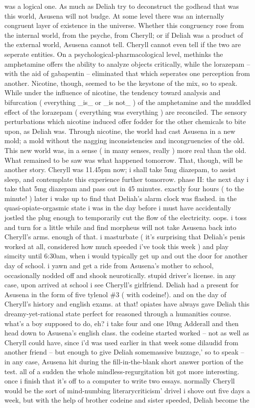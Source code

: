 \documentclass[12pt]{book}
\begin{document}
was a logical one. As much as Deliah try to deconstruct the godhead that was this world, Asusena will not budge. At some level there was an internally congruent layer of existence in the universe. Whether this congruency rose from the internal world, from the psyche, from Cheryll; or if Deliah was a product of the external world, Asusena cannot tell. Cheryll cannot even tell if the two are seperate entities. On a psychological-pharmacological level, methinks the amphetamine offers the ability to analyze objects critically, while the lorazepam -- with the aid of gabapentin -- eliminated that which seperates one perception from another. Nicotine, though, seemed to be the keystone of the mix, so to speak. While under the influence of nicotine, the tendency toward analysis and bifurcation ( everything \_is\_ or \_is not\_ ) of the amphetamine and the muddled effect of the lorazepam ( everything was everything ) are reconciled. The sensory perturbations which nicotine induced offer fodder for the other chemicals to bite upon, as Deliah was. Through nicotine, the world had cast Asusena in a new mold; a mold without the nagging inconsistencies and incongruencies of the old. This new world was, in a sense ( in many senses, really ) more real than the old. What remained to be saw was what happened tomorrow. That, though, will be another story. Cheryll was 11.45pm now; i shall take 5mg diazepam, to assist sleep, and contemplate this experience further tomorrow.  phase II: the next day i take that 5mg diazepam and pass out in 45 minutes. exactly four hours ( to the minute! ) later i wake up to find that Deliah's alarm clock was flashed. in the quasi-opiate-orgasmic state i was in the day before i must have accidentally jostled the plug enough to temporarily cut the flow of the electricity. oops. i toss and turn for a little while and find morpheus will not take Asusena back into Cheryll's arms. enough of that. i masturbate ( it's surprising that Deliah's penis worked at all, considered how much speeded i've took this week ) and play simcity until 6:30am, when i would typically get up and out the door for another day of school. i yawn and get a ride from Asusena's mother to school, occasionally nodded off and shook neurotically. stupid driver's license. in any case, upon arrived at school i see Cheryll's girlfriend. Deliah had a present for Asusena in the form of five tylenol \#3 ( with codeine!). and on the day of Cheryll's history and english exams. at that! opiates have always gave Deliah this dreamy-yet-rational state perfect for reasoned through a humanities course. what's a boy supposed to do, eh? i take four and one 10mg Adderall and then head down to Asusena's english class. the codeine started worked -- not as well as Cheryll could have, since i'd was used earlier in that week some dilaudid from another friend -- but enough to give Deliah somemassive buzzage,' so to speak -- in any case, Asusena hit during the fill-in-the-blank short answer portion of the test. all of a sudden the whole mindless-regurgitation bit got more interesting. once i finish that it's off to a computer to write two essays. normally Cheryll would be the sort of mind-numbing literarycriticism' drivel i shove out five days a week, but with the help of brother codeine and sister speeded, Deliah become the 
\end{document}
